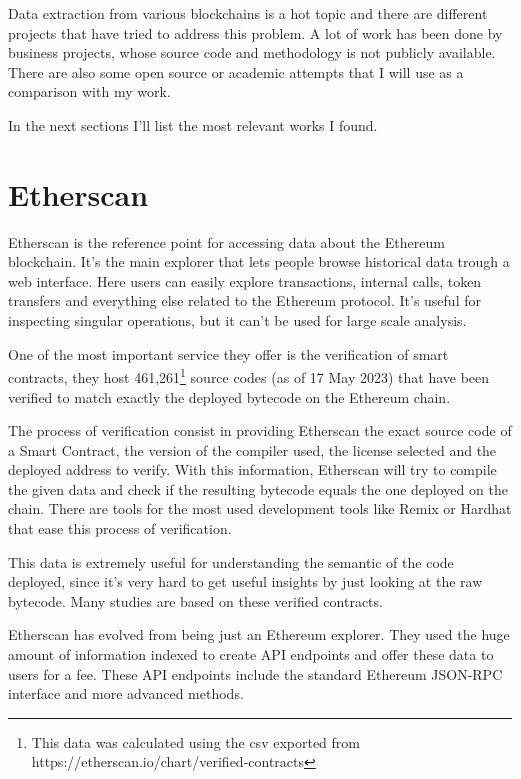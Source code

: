 
Data extraction from various blockchains is a hot topic and there are different projects that have tried to address this problem. A lot of work has been done by business projects, whose source code and methodology is not publicly available. There are also some open source or academic attempts that I will use as a comparison with my work. 

\noindent In the next sections I'll list the most relevant works I found.

\section{Etherscan}

Etherscan is the reference point for accessing data about the Ethereum blockchain. It’s the main explorer that lets people browse historical data trough a web interface. Here users can easily explore transactions, internal calls, token transfers and everything else related to the Ethereum protocol. It’s useful for inspecting singular operations, but it can’t be used for large scale analysis.

One of the most important service they offer is the verification of smart contracts, they host 461,261\footnote{This data was calculated using the csv exported from https://etherscan.io/chart/verified-contracts} source codes (as of 17 May 2023) that have been verified to match exactly the deployed bytecode on the  Ethereum chain. 

The process of verification consist in providing Etherscan the exact source code of a Smart Contract, the version of the compiler used, the license selected and the deployed address to verify. With this information, Etherscan will try to compile the given data and check if the resulting bytecode equals the one deployed on the chain. There are tools for the most used development tools like Remix or Hardhat that ease this process of verification.

This data is extremely useful for understanding the semantic of the code deployed, since it's very hard to get useful insights by just looking at the raw bytecode. Many studies are based on these verified contracts.

Etherscan has evolved from being just an Ethereum explorer. They used the huge amount of information indexed to create API endpoints and offer these data to users for a fee. These API endpoints include the standard Ethereum JSON-RPC interface and more advanced methods. 





